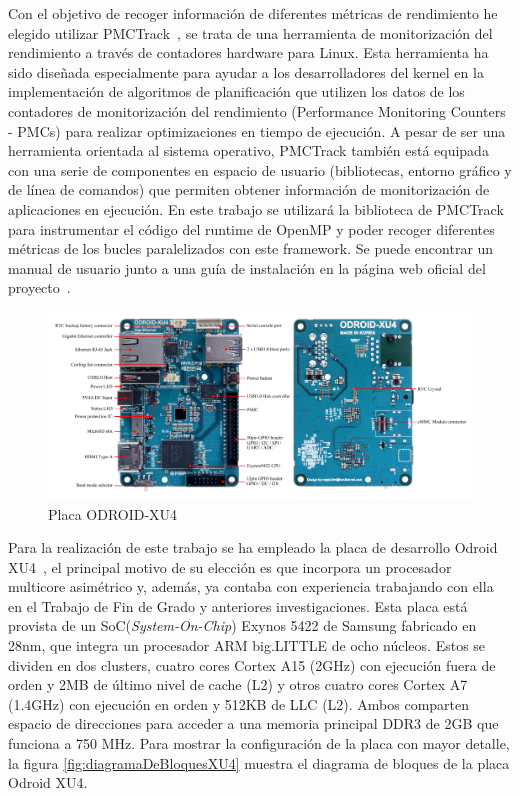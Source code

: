 Con el objetivo de recoger información de diferentes métricas de rendimiento he elegido utilizar PMCTrack~\cite{pmctrack}, se trata de una herramienta de monitorización del rendimiento a través de contadores hardware para Linux. Esta herramienta ha sido diseñada especialmente para ayudar a los desarrolladores del kernel en la implementación de algoritmos de planificación que utilizen los datos de los contadores de monitorización del rendimiento (Performance Monitoring Counters - PMCs) para realizar optimizaciones en tiempo de ejecución. A pesar de ser una herramienta orientada al sistema operativo, PMCTrack también está equipada con una serie de componentes en espacio de usuario (bibliotecas, entorno gráfico y de línea de comandos) que permiten obtener información de monitorización de aplicaciones en ejecución. En este trabajo se utilizará la biblioteca de PMCTrack para instrumentar el código del runtime de OpenMP y poder recoger diferentes métricas de los bucles paralelizados con este framework. Se puede encontrar un manual de usuario junto a una guía de instalación en la página web oficial del proyecto~\cite{pmc-userguide}.
\begin{figure}[tbp]
    \centering
    \includegraphics[width=1\textwidth]{foto_placa_XU4.png}
    \caption{Placa ODROID-XU4}
    \label{fig:fotoPlacaXU4}
\end{figure}

Para la realización de este trabajo se ha empleado la placa de desarrollo Odroid XU4~\cite{odroid-manual}, el principal motivo de su elección es que incorpora un procesador multicore asimétrico y, además, ya contaba con experiencia trabajando con ella en el Trabajo de Fin de Grado y anteriores investigaciones. Esta placa está provista de un SoC(\emph{System-On-Chip}) Exynos 5422 de Samsung fabricado en 28nm, que integra un procesador ARM big.LITTLE de ocho núcleos. Estos se dividen en dos clusters, cuatro cores Cortex A15 (2GHz) con ejecución fuera de orden y 2MB de último nivel de cache (L2) y otros cuatro cores Cortex A7 (1.4GHz) con ejecución en orden y 512KB de LLC (L2). Ambos comparten espacio de direcciones para acceder a una memoria principal DDR3 de 2GB que funciona a 750  MHz. Para mostrar la configuración de la placa con mayor detalle, la figura \ref{fig:diagramaDeBloquesXU4} muestra el diagrama de bloques de la placa Odroid XU4.



